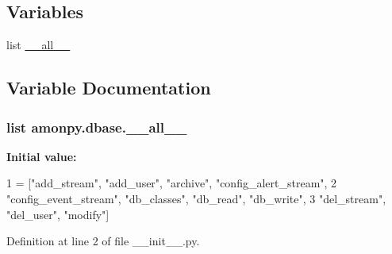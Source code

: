 \subsection*{Variables}
\begin{DoxyCompactItemize}
\item 
list \hyperlink{namespaceamonpy_1_1dbase_a73a84717e7e0a7c0189c3962bfa38641}{\-\_\-\-\_\-all\-\_\-\-\_\-}
\end{DoxyCompactItemize}


\subsection{Variable Documentation}
\hypertarget{namespaceamonpy_1_1dbase_a73a84717e7e0a7c0189c3962bfa38641}{
\subsubsection[{\-\_\-\-\_\-all\-\_\-\-\_\-}]{\setlength{\rightskip}{0pt plus 5cm}list amonpy.\-dbase.\-\_\-\-\_\-all\-\_\-\-\_\-}}\label{namespaceamonpy_1_1dbase_a73a84717e7e0a7c0189c3962bfa38641}
{\bfseries Initial value\-:}
\begin{DoxyCode}
1 = [\textcolor{stringliteral}{"add\_stream"}, \textcolor{stringliteral}{"add\_user"}, \textcolor{stringliteral}{"archive"}, \textcolor{stringliteral}{"config\_alert\_stream"}, 
2              \textcolor{stringliteral}{"config\_event\_stream"}, \textcolor{stringliteral}{"db\_classes"}, \textcolor{stringliteral}{"db\_read"}, \textcolor{stringliteral}{"db\_write"}, 
3              \textcolor{stringliteral}{"del\_stream"}, \textcolor{stringliteral}{"del\_user"}, \textcolor{stringliteral}{"modify"}]
\end{DoxyCode}


Definition at line 2 of file \-\_\-\-\_\-init\-\_\-\-\_\-.\-py.

